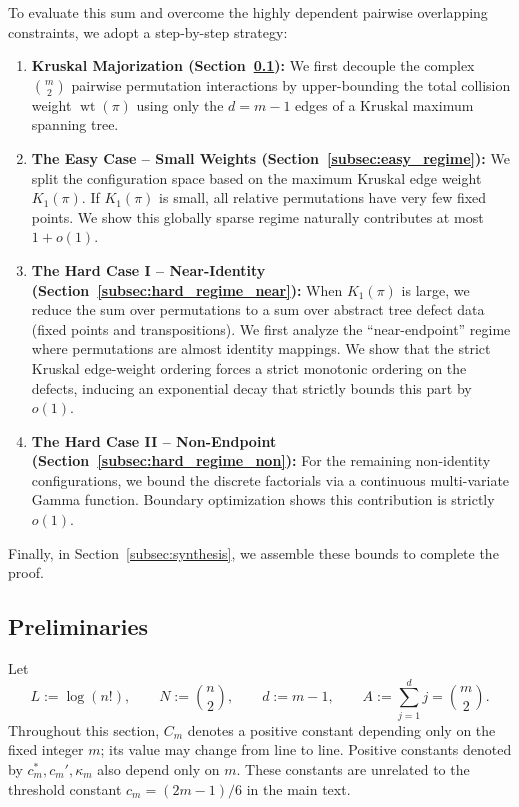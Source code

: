 \documentclass[11pt,reqno]{amsart}
\theoremstyle{definition}
\theoremstyle{remark}
\newcommand{\wt}{\operatorname{wt}}
\begin{document}
To evaluate this sum and overcome the highly dependent pairwise overlapping constraints, we adopt a step-by-step strategy:
\begin{enumerate}
    \item \textbf{Kruskal Majorization (Section~\ref{subsec:preliminaries}):} We first decouple the complex \(\binom{m}{2}\) pairwise permutation interactions by upper-bounding the total collision weight \(\wt(\pi)\) using only the \(d = m-1\) edges of a Kruskal maximum spanning tree.
    \item \textbf{The Easy Case -- Small Weights (Section~\ref{subsec:easy_regime}):} We split the configuration space based on the maximum Kruskal edge weight \(K_1(\pi)\). If \(K_1(\pi)\) is small, all relative permutations have very few fixed points. We show this globally sparse regime naturally contributes at most \(1+o(1)\).
    \item \textbf{The Hard Case I -- Near-Identity (Section~\ref{subsec:hard_regime_near}):} When \(K_1(\pi)\) is large, we reduce the sum over permutations to a sum over abstract tree defect data (fixed points and transpositions). We first analyze the ``near-endpoint'' regime where permutations are almost identity mappings. We show that the strict Kruskal edge-weight ordering forces a strict monotonic ordering on the defects, inducing an exponential decay that strictly bounds this part by \(o(1)\).
    \item \textbf{The Hard Case II -- Non-Endpoint (Section~\ref{subsec:hard_regime_non}):} For the remaining non-identity configurations, we bound the discrete factorials via a continuous multi-variate Gamma function. Boundary optimization shows this contribution is strictly $o(1)$.
\end{enumerate}

Finally, in Section~\ref{subsec:synthesis}, we assemble these bounds to complete the proof. 



\subsection{Preliminaries}\label{subsec:preliminaries}

Let
\[
        L:=\log(n!), \qquad N:=\binom n2,
        \qquad d:=m-1,
        \qquad A:=\sum_{j=1}^d j=\binom m2 .
\]
Throughout this section, $C_m$ denotes a positive constant depending only on the fixed integer $m$; its value may change from line to line. Positive constants denoted by $c_m^\ast,c_m',\kappa_m$ also depend only on $m$. These constants are unrelated to the threshold constant $c_m=(2m-1)/6$ in the main text.
\end{document}
